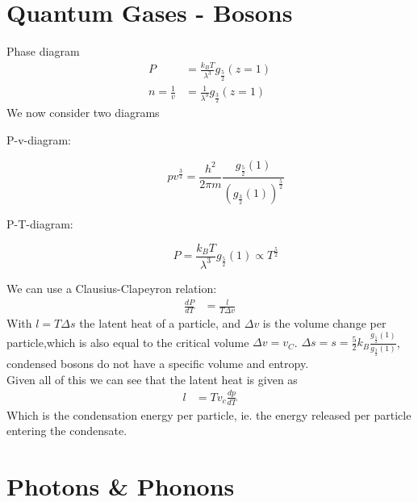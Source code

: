 \documentclass{report}
\begin{document}
\section{Quantum Gases - Bosons}
Phase diagram 
\begin{align*}
  P &= \frac{k_B T}{\lambda^{3}} g_{\frac{5}{2}}\left( z = 1 \right)  \\
  n = \frac{1}{v} &= \frac{1}{\lambda^{3}} g_{\frac{3}{2}} \left( z=1 \right) 
\end{align*}
We now consider two diagrams
\begin{description}
  \item[P-v-diagram:] \[
      p v ^{\frac{3}{2}} = \frac{h^2}{2\pi m} \frac{g_{\frac{5}{2}}\left( 1 \right) }{\left( g_{\frac{3}{2}}\left( 1 \right)  \right) ^{\frac{5}{2}}}
  \] 
  \item[P-T-diagram:] \[
    P = \frac{k_B T}{\lambda^{3}} g_{\frac{5}{2}}\left( 1 \right) \propto T^{\frac{5}{2}}
  \] 
\end{description}
We can use a Clausius-Clapeyron relation: 
\begin{align*}
  \frac{dP}{dT} &= \frac{l}{T \Delta v}
\end{align*}
With $l = T \Delta s$ the latent heat of a particle, and $\Delta v$ is the volume change per particle,which is also equal to the critical volume $\Delta v = v_C$.
$\Delta s = s = \frac{5}{2} k_B \frac{g_{\frac{5}{2}}\left( 1 \right) }{g_{\frac{3}{2}}\left( 1 \right) }$, condensed bosons do not have a specific volume and entropy. \\
Given all of this we can see that the latent heat is given as
\begin{align*}
  l &= T v_c \frac{dp}{dT} 
\end{align*}
Which is the condensation energy per particle, ie. the energy released per particle entering the condensate.
\section{Photons \& Phonons}
\end{document}

